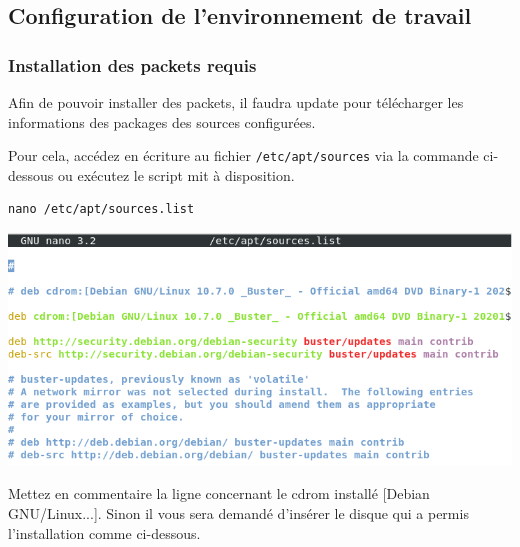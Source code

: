 \documentclass[12pt,a4paper]{article}
\newcommand{\code}[1]{\colorbox{light-gray}{\texttt{#1}}}
\begin{document}
\begin{flushleft}
       \subsection{Configuration de l'environnement de travail}
       
      
        \subsubsection{Installation des packets requis}
       \item Afin de pouvoir installer des packets, il faudra update pour télécharger les informations des packages des sources configurées. 
       \item Pour cela, accédez en écriture au fichier \code{/etc/apt/sources} via la commande ci-dessous ou exécutez le script mit à disposition.

       \begin{lstlisting}
nano /etc/apt/sources.list
       \end{lstlisting}      

       \begin{center}
            \includegraphics[scale=0.6]{sources}
        \end{center}
        
       \item Mettez en commentaire la ligne concernant le cdrom installé [Debian GNU/Linux...]. Sinon il vous sera demandé d'insérer le disque qui a permis l'installation comme ci-dessous.             


\end{flushleft}
\end{document}

